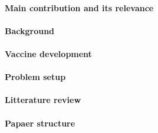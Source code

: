 \paragraph{Main contribution and its relevance}
\paragraph{Background}
\paragraph{Vaccine development}
\paragraph{Problem setup}
\paragraph{Litterature review}
\paragraph{Papaer structure}